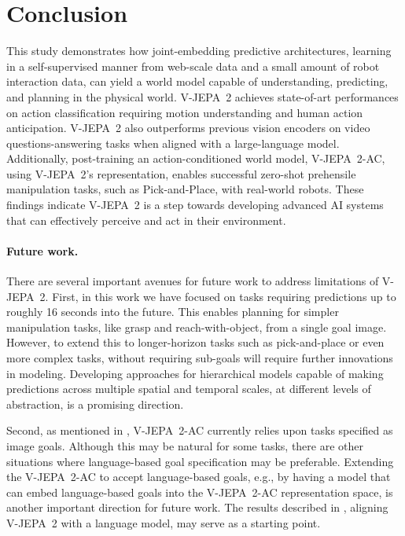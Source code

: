 \documentclass[]{fairmeta}
\newcommand{\model}{V-JEPA~2\xspace}
\newcommand{\acModel}{V-JEPA~2-AC\xspace}
\begin{document}
\newpage

\section{Conclusion}
\label{section:conclusion}

This study demonstrates how joint-embedding predictive architectures, learning in a self-supervised manner from web-scale data and a small amount of robot interaction data, can yield a world model capable of understanding, predicting, and planning in the physical world. 
\model achieves state-of-art performances on action classification requiring motion understanding and human action anticipation. \model also outperforms previous vision encoders on video questions-answering tasks when aligned with a large-language model. Additionally, post-training an action-conditioned world model, \acModel, using \model's representation, enables successful zero-shot prehensile manipulation tasks, such as Pick-and-Place, with real-world robots. These findings indicate \model is a step towards developing advanced AI systems that can effectively perceive and act in their environment.

\paragraph{\bf Future work.} There are several important avenues for future work to address limitations of \model. First, in this work we have focused on tasks requiring predictions up to roughly 16 seconds into the future. This enables planning for simpler manipulation tasks, like grasp and reach-with-object, from a single goal image. However, to extend this to longer-horizon tasks such as pick-and-place or even more complex tasks, without requiring sub-goals will require further innovations in modeling. Developing approaches for hierarchical models capable of making predictions across multiple spatial and temporal scales, at different levels of abstraction, is a promising direction.

Second, as mentioned in , \acModel currently relies upon tasks specified as image goals. Although this may be natural for some tasks, there are other situations where language-based goal specification may be preferable. Extending the \acModel to accept language-based goals, e.g., by having a model that can embed language-based goals into the \acModel representation space, is another important direction for future work. The results described in , aligning \model with a language model, may serve as a starting point.
\end{document}
